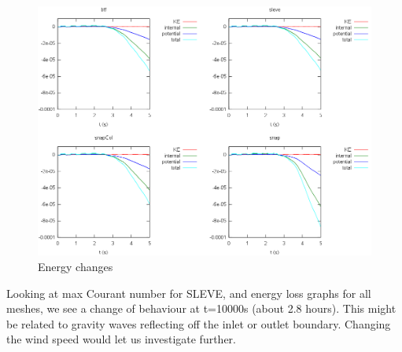 \begin{figure}
	\includegraphics[width=\textwidth]{interim-results/gravityWavesEnergy.png}
	\caption{Energy changes}
	\label{fig:gw:energy}
\end{figure}

Looking at max Courant number for SLEVE, and energy loss graphs for all meshes, we see a change of behaviour at t=10000s (about 2.8 hours).  This might be related to gravity waves reflecting off the inlet or outlet boundary.  Changing the wind speed would let us investigate further.
